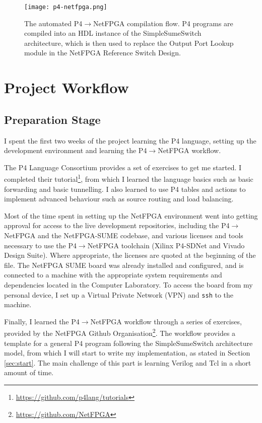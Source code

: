\begin{figure}[!ht]
	\centering
	\texttt{[image: p4-netfpga.png]}
	\caption{The automated P4$\rightarrow$NetFPGA compilation flow. P4 programs are compiled into an HDL instance of the SimpleSumeSwitch architecture, which is then used to replace the Output Port Lookup module in the NetFPGA Reference Switch Design.}
	\label{fig:p4-netfpga}
\end{figure}

\section{Project Workflow}
	\subsection{Preparation Stage}
	I spent the first two weeks of the project learning the P4 language, setting up the development environment and learning the P4$\rightarrow$NetFPGA workflow.
	
	The P4 Language Consortium \cite{p4.org} provides a set of exercises to get me started. I completed their tutorial\footnote{\url{https://github.com/p4lang/tutorials}}, from which I learned the language basics such as basic forwarding and basic tunnelling. I also learned to use P4 tables and actions to implement advanced behaviour such as source routing and load balancing. 
	
	Most of the time spent in setting up the NetFPGA environment went into getting approval for access to the live development repositories, including the P4$\rightarrow$NetFPGA and the NetFPGA-SUME codebase, and various licenses and tools necessary to use the P4$\rightarrow$NetFPGA toolchain (Xilinx P4-SDNet and Vivado Design Suite). Where appropriate, the licenses are quoted at the beginning of the file. The NetFPGA SUME board was already installed and configured, and is connected to a machine with the appropriate system requirements and dependencies located in the Computer Laboratory. To access the board from my personal device, I set up a Virtual Private Network (VPN) and \texttt{ssh} to the machine.
	
	Finally, I learned the P4$\rightarrow$NetFPGA workflow through a series of exercises, provided by the NetFPGA Github Organisation\footnote{\url{https://github.com/NetFPGA}}. The workflow provides a template for a general P4 program following the SimpleSumeSwitch architecture model, from which I will start to write my implementation, as stated in Section \ref{sec:start}. The main challenge of this part is learning Verilog and Tcl in a short amount of time.
	
